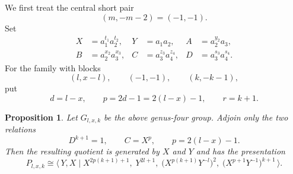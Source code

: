 \documentclass{article}
\newtheorem{prop}[theorem]{Proposition}
\newcommand{\gp}[2]{\langle\, #1 \mid #2 \,\rangle}
\begin{document}
We first treat the central short pair
\[
      (m,-m-2)=(-1,-1).
\]
Set
\[
\begin{aligned}
X&=a_1^{t_1}a_2^{t_2},& Y&=a_1a_2,& A&=a_2^{y_2}a_3,\\
B&=a_2^{x_2}a_3^{x_3},& C&=a_3^{z_3}a_4^{z_4},& D&=a_3^{s_3}a_4^{s_4}.
\end{aligned}
\]
For the family with blocks
\[
    (l,x-l),\qquad (-1,-1),\qquad (k,-k-1),
\]
put
\[
    d=l-x,\qquad p=2d-1=2(l-x)-1,\qquad r=k+1.
\]

\begin{prop}
\label{prop:genus-four-x-minus-two-minus-one-quotient}
Let $G_{l,x,k}$ be the above genus-four group.  Adjoin only the two
relations
\[
      D^{k+1}=1,\qquad C=X^p,
      \qquad p=2(l-x)-1.
\]
Then the resulting quotient is generated by $X$ and $Y$ and has the
presentation
\begin{equation}
\label{eq:genus-four-x-minus-two-minus-one-four-relator}
P_{l,x,k}
\cong
\gp{Y,X}{
    X^{2p(k+1)+1},\;
    Y^{2l+1},\;
    \bigl(X^{p(k+1)}Y^{-l}\bigr)^2,\;
    \bigl(X^{p+1}Y^{-1}\bigr)^{k+1}
}.
\end{equation}

\end{prop}
\end{document}
